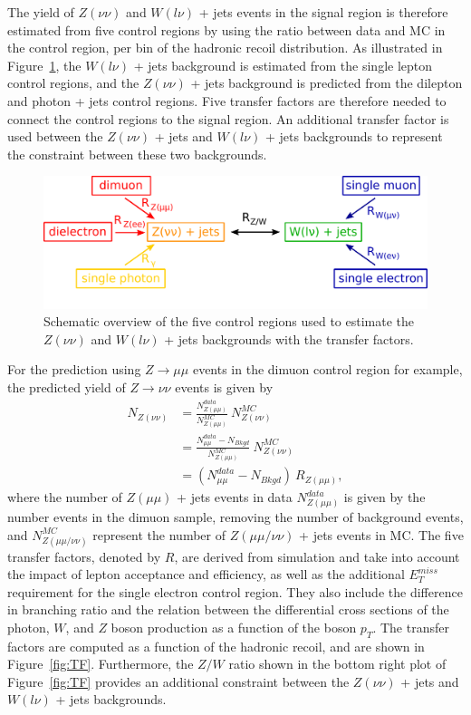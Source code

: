 The yield of $Z(\nu\nu)$ and $W(l\nu)$ + jets events in the signal region is therefore estimated from five control regions by using the ratio between data and MC in the control region, per bin of the hadronic recoil distribution. As illustrated in Figure~\ref{fig:CR}, the $W(l\nu)$ + jets background is estimated from the single lepton control regions, and the $Z(\nu\nu)$ + jets background is predicted from the dilepton and photon + jets control regions. Five transfer factors are therefore needed to connect the control regions to the signal region. An additional transfer factor is used between the $Z(\nu\nu)$ + jets and $W(l\nu)$ + jets backgrounds to represent the constraint between these two backgrounds. 

\begin{figure}[ht]
  \centering
 \includegraphics[width=\textwidth]{bkgd_estimation.pdf} 
 \caption{Schematic overview of the five control regions used to estimate the $Z(\nu\nu)$ and $W(l\nu)$ + jets backgrounds with the transfer factors.}
 \label{fig:CR}
\end{figure}

For the prediction using $Z\rightarrow \mu\mu$ events in the dimuon control region for example, the predicted yield of $Z\rightarrow\nu\nu$ events is given by
\begin{align}
 N_{Z(\nu\nu)} &= \frac{N_{Z(\mu\mu)}^{data}}{N_{Z(\mu\mu)}^{MC}}\ N_{Z(\nu\nu)}^{MC}\\
 &= \frac{N_{\mu\mu}^{data} - N_{Bkgd}}{N_{Z(\mu\mu)}^{MC}}\ N_{Z(\nu\nu)}^{MC} \\
 &= \left(N_{\mu\mu}^{data} - N_{Bkgd}\right)\ R_{Z(\mu\mu)},
\end{align}
where the number of $Z(\mu\mu)$ + jets events in data $N_{Z(\mu\mu)}^{data}$ is given by the number events in the dimuon sample, removing the number of background events, and $N_{Z(\mu\mu/\nu\nu)}^{MC}$ represent the number of $Z(\mu\mu/\nu\nu)$ + jets events in MC. The five transfer factors, denoted by $R$, are derived from simulation and take into account the impact of lepton acceptance and efficiency, as well as the additional $E_T^{miss}$ requirement for the single electron control region. They also include the difference in branching ratio and the relation between the differential cross sections of the photon, $W$, and $Z$ boson production as a function of the boson $p_T$. The transfer factors are computed as a function of the hadronic recoil, and are shown in Figure~\ref{fig:TF}. Furthermore, the $Z/W$ ratio shown in the bottom right plot of Figure~\ref{fig:TF} provides an additional constraint between the $Z(\nu\nu)$ + jets and $W(l\nu)$ + jets backgrounds.

